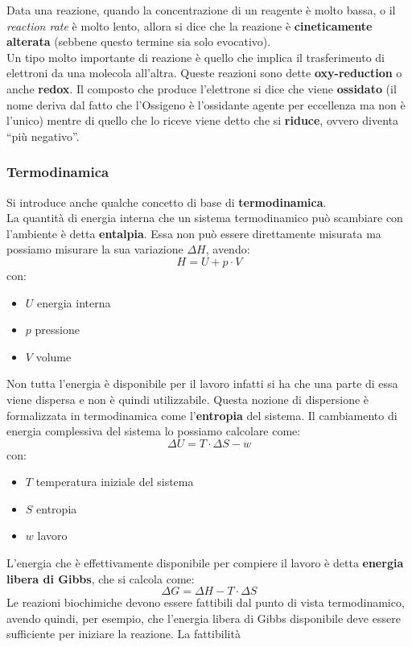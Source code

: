 \documentclass[a4paper,12pt, oneside]{book}
\begin{document}
Data una reazione, quando la concentrazione di un reagente è molto bassa, o il
\textit{reaction rate} è molto lento, allora si dice che la reazione è
\textbf{cineticamente alterata} (sebbene questo termine sia solo evocativo).\\
Un tipo molto importante di reazione è quello che implica il trasferimento di
elettroni da una molecola all'altra. Queste reazioni sono dette
\textbf{oxy-reduction} o anche \textbf{redox}. Il composto che produce
l'elettrone si dice che viene \textbf{ossidato} (il nome deriva dal fatto che
l'Ossigeno è l'ossidante agente per eccellenza ma non è l'unico) mentre di
quello che lo riceve viene detto che si \textbf{riduce}, ovvero diventa ``più
negativo''.
\subsubsection{Termodinamica}
Si introduce anche qualche concetto di base di \textbf{termodinamica}.\\
La quantità di energia interna che un sistema termodinamico può scambiare con
l'ambiente è detta \textbf{entalpia}. Essa non può essere direttamente misurata
ma possiamo misurare la sua variazione $\Delta H$, avendo:
\[H=U+p\cdot V\]
con:
\begin{itemize}
  \item $U$ energia interna
  \item $p$ pressione
  \item $V$ volume
\end{itemize}
Non tutta l'energia è disponibile per il lavoro infatti si ha che una parte di
essa viene dispersa e non è quindi utilizzabile. Questa nozione di dispersione è
formalizzata in termodinamica come l'\textbf{entropia} del sistema. Il
cambiamento di energia complessiva del sistema lo possiamo calcolare come:
\[\Delta U=T\cdot \Delta S-w\]
con:
\begin{itemize}
  \item $T$ temperatura iniziale del sistema
  \item $S$ entropia
  \item $w$ lavoro
\end{itemize}
L'energia che è effettivamente disponibile per compiere il lavoro è detta
\textbf{energia libera di Gibbs}, che si calcola come:
\[\Delta G=\Delta H-T\cdot \Delta S\]
Le reazioni biochimiche devono essere fattibili dal punto di vista
termodinamico, avendo quindi, per esempio, che l'energia libera di Gibbs
disponibile deve essere sufficiente per iniziare la reazione. La fattibilità
\end{document}
